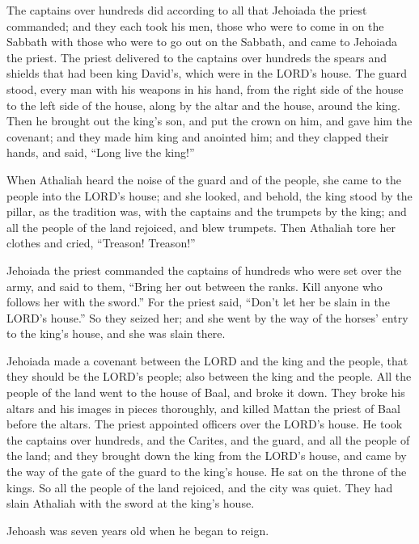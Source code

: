  The captains over hundreds did according to all that
Jehoiada the priest commanded; and they each took his men, those who
were to come in on the Sabbath with those who were to go out on the
Sabbath, and came to Jehoiada the priest.  The priest
delivered to the captains over hundreds the spears and shields that had
been king David's, which were in the LORD's house.  The
guard stood, every man with his weapons in his hand, from the right side
of the house to the left side of the house, along by the altar and the
house, around the king.  Then he brought out the king's
son, and put the crown on him, and gave him the covenant; and they made
him king and anointed him; and they clapped their hands, and said,
``Long live the king!''

 When Athaliah heard the noise of the guard and of the
people, she came to the people into the LORD's house; 
and she looked, and behold, the king stood by the pillar, as the
tradition was, with the captains and the trumpets by the king; and all
the people of the land rejoiced, and blew trumpets. Then Athaliah tore
her clothes and cried, ``Treason! Treason!''

 Jehoiada the priest commanded the captains of hundreds
who were set over the army, and said to them, ``Bring her out between
the ranks. Kill anyone who follows her with the sword.'' For the priest
said, ``Don't let her be slain in the LORD's house.''  So
they seized her; and she went by the way of the horses' entry to the
king's house, and she was slain there.

 Jehoiada made a covenant between the LORD and the king
and the people, that they should be the LORD's people; also between the
king and the people.  All the people of the land went to
the house of Baal, and broke it down. They broke his altars and his
images in pieces thoroughly, and killed Mattan the priest of Baal before
the altars. The priest appointed officers over the LORD's house.
 He took the captains over hundreds, and the Carites, and
the guard, and all the people of the land; and they brought down the
king from the LORD's house, and came by the way of the gate of the guard
to the king's house. He sat on the throne of the kings. 
So all the people of the land rejoiced, and the city was quiet. They had
slain Athaliah with the sword at the king's house.

 Jehoash was seven years old when he began to reign.


